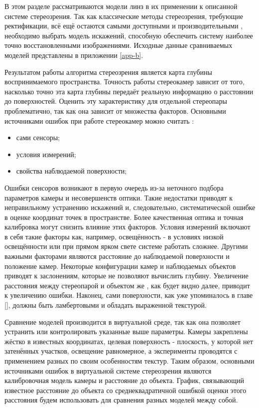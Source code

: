 
В этом разделе рассматриваются модели линз в их применении к описанной системе стереозрения. 
Так как классические методы стереозрения, требующие ректификации, всё ещё остаются самыми доступными и производительными \cite{disparity_review}, 
необходимо выбрать модель искажений, способную обеспечить систему наиболее точно восстановленными изображениями. 
Исходные данные сравниваемых моделей представлены в приложении \ref{app-b}.

Результатом работы алгоритма стереозрения является карта глубины воспринимаемого пространства.  Точность работы 
стереокамер зависит от того, насколько точно эта карта глубины передаёт реальную информацию о расстоянии до поверхностей.
Оценить эту характеристику для отдельной стереопары проблематично, так как она зависит от множества факторов. Основными источниками
 ошибок при работе стереокамер можно считать \cite{kinect_perf}: 
\begin{itemize}
    \item сами сенсоры;
    \item условия измерений;
    \item свойства наблюдаемой поверхности;
\end{itemize}

Ошибки сенсоров возникают в первую очередь из-за неточного подбора параметров камеры и несовершенств оптики. Такие недостатки приводят
к неправильному устранению искажений и, следовательно, систематической ошибке в оценке координат точек в пространстве. Более 
качественная оптика и точная калибровка могут снизить влияние этих факторов.
Условия измерений включают в себя такие факторы как, например, освещённость - в условиях низкой освещённости или при прямом ярком свете системе работать сложнее.
Другими важными факторами являются расстояние до наблюдаемой поверхности и положение камер. Некоторые конфигурации камер и наблюдаемых объектов приводят к
заслонениям, которые не позволяют вычислить глубину. Увеличение расстояния между стереопарой и объектом же , как будет видно далее, приводит к увеличению ошибки.  
Наконец, сами поверхности, как уже упоминалось в главе \ref{}, должны быть ламбертовыми и обладать выраженной текстурой. 

Сравнение моделей производится в виртуальной среде, так как она позволяет устранить или контролировать указанные выше параметры. Камеры закреплены жёстко в 
известных координатах, целевая поверхность - плоскость, у которой нет затенённых участков, освещение равномерное, а эксперименты проводятся с 
применением разных по своим особенностям текстур. Таким образом, основными источниками ошибок в виртуальной системе стереозрения являются калибровочная модель 
камеры и расстояние до объекта. График, связывающий известное расстояние до объекта со среднеквадратичной ошибкой оценки этого расстояния будем использовать
для сравнения разных моделей между собой. 

